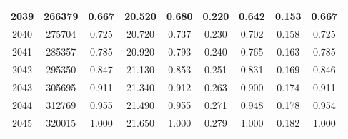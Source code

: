 \documentclass[withoutpreface,bwprint]{cumcmthesis} %
\begin{document}
\begin{table}[H]
\begin{tabular}{|c|c|c|c|c|c|c|c|c|}
    2039 & 266379    & 0.667 & 20.520 & 0.680 & 0.220       & 0.642 & 0.153    & 0.667 \\ \hline
    2040 & 275704    & 0.725 & 20.720 & 0.737 & 0.230       & 0.702 & 0.158    & 0.725 \\ \hline
    2041 & 285357    & 0.785 & 20.920 & 0.793 & 0.240       & 0.765 & 0.163    & 0.785 \\ \hline
    2042 & 295350    & 0.847 & 21.130 & 0.853 & 0.251       & 0.831 & 0.169    & 0.846 \\ \hline
    2043 & 305695    & 0.911 & 21.340 & 0.912 & 0.263       & 0.900 & 0.174    & 0.911 \\ \hline
    2044 & 312769    & 0.955 & 21.490 & 0.955 & 0.271       & 0.948 & 0.178    & 0.954 \\ \hline
    2045 & 320015    & 1.000 & 21.650 & 1.000 & 0.279       & 1.000 & 0.182    & 1.000 \\ \hline
    \end{tabular}
\end{table}
\end{document}
